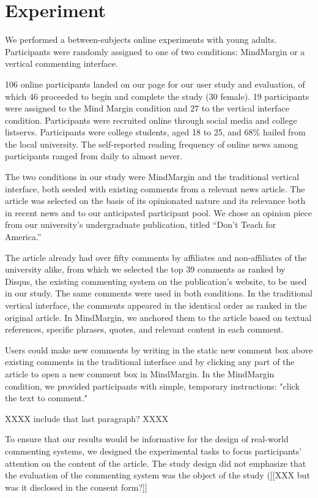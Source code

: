 \section{Experiment}

We performed a between-subjects online experiments with young adults. Participants were randomly assigned to one of two conditions: MindMargin or a vertical commenting interface.

106 online participants landed on our page for our user study and evaluation, of which 46 proceeded to begin and complete the study (30 female). 19 participants were assigned to the Mind Margin condition and 27 to the vertical interface condition.  Participants were recruited online through social media and college listservs. Participants were college students, aged 18 to 25, and 68\% hailed from the local university. The self-reported reading frequency of online news among participants ranged from daily to almost never. 

The two conditions in our study were MindMargin and the traditional vertical interface, both seeded with existing comments from a relevant news article. The article was selected on the basis of its opinionated nature and its relevance both in recent news and to our anticipated participant pool. We chose an opinion piece from our university's undergraduate publication, titled “Don't Teach for America.” 

The article already had over fifty comments by affiliates and non-affiliates of the university alike, from which we selected the top 39 comments as ranked by Disqus, the existing commenting system on the publication's website, to be used in our study. The same comments were used in both conditions. In the traditional vertical interface, the comments appeared in the identical order as ranked in the original article. In MindMargin, we anchored them to the article based on textual references, specific phrases, quotes, and relevant content in each comment. 

Users could make new comments by writing in the static new comment box above existing comments in the traditional interface and by clicking any part of the article to open a new comment box in MindMargin. In the MindMargin condition, we provided participants with simple, temporary instructions: "click the text to comment."

XXXX include that last paragraph? XXXX

To ensure that our results would be informative for the design of real-world commenting systems, we designed the experimental tasks to focus participants' attention on the content of the article.  The study design did not emphasize that the evaluation of the commenting system was the object of the study ([[XXX but was it disclosed in the consent form?]]

